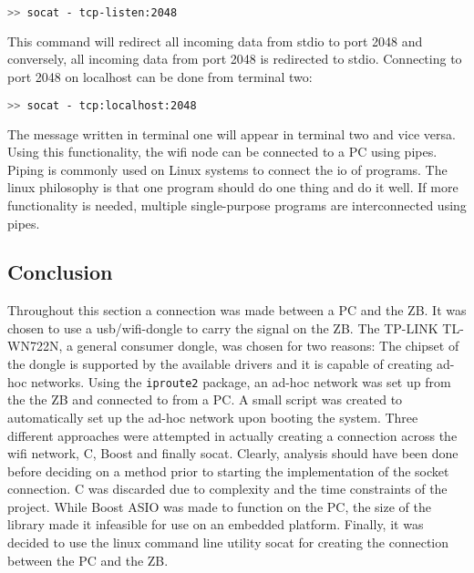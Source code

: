 \begin{lstlisting}[language=bash]
>> socat - tcp-listen:2048
\end{lstlisting}

This command will redirect all incoming data from stdio to port 2048 and conversely, all incoming data from port 2048 is redirected to stdio. 
Connecting to port 2048 on localhost can be done from terminal two:

\begin{lstlisting}[language=bash]
>> socat - tcp:localhost:2048
\end{lstlisting}

The message written in terminal one will appear in terminal two and vice versa.
Using this functionality, the wifi node can be connected to a PC using pipes.
Piping is commonly used on Linux systems to connect the io of programs.
The linux philosophy is that one program should do one thing and do it well.
If more functionality is needed, multiple single-purpose programs are interconnected using pipes.

\subsection{Conclusion}

Throughout this section a connection was made between a PC and the ZB.
It was chosen to use a usb/wifi-dongle to carry the signal on the ZB.
The TP-LINK TL-WN722N, a general consumer dongle, was chosen for two reasons: The chipset of the dongle is supported by the available drivers and it is capable of creating ad-hoc networks.
Using the \texttt{iproute2} package, an ad-hoc network was set up from the the ZB and connected to from a PC.
A small script was created to automatically set up the ad-hoc network upon booting the system.
Three different approaches were attempted in actually creating a connection across the wifi network, C, Boost and finally socat.
Clearly, analysis should have been done before deciding on a method prior to starting the implementation of the socket connection.
C was discarded due to complexity and the time constraints of the project.
While Boost ASIO was made to function on the PC, the size of the library made it infeasible for use on an embedded platform.
Finally, it was decided to use the linux command line utility socat for creating the connection between the PC and the ZB.